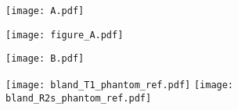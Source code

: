 \documentclass[preview]{standalone}
\begin{document}
\begin{figure}
	\centering
	\begin{minipage}{.03\textwidth}
		\texttt{[image: A.pdf]}\vspace*{8cm}
	\end{minipage}
	\hfill %
	\begin{minipage}{.96\textwidth}
		\texttt{[image: figure\_A.pdf]}
	\end{minipage}%

	\vspace*{0.2cm}

	\begin{minipage}{.03\textwidth}
		\texttt{[image: B.pdf]}\vspace*{2.5cm}
	\end{minipage}
	\hfill %
	\begin{minipage}{.96\textwidth}
		\texttt{[image: bland\_T1\_phantom\_ref.pdf]}\hspace{0.2cm}
		\texttt{[image: bland\_R2s\_phantom\_ref.pdf]}\hfill
	\end{minipage}%

\end{figure}
\end{document}
